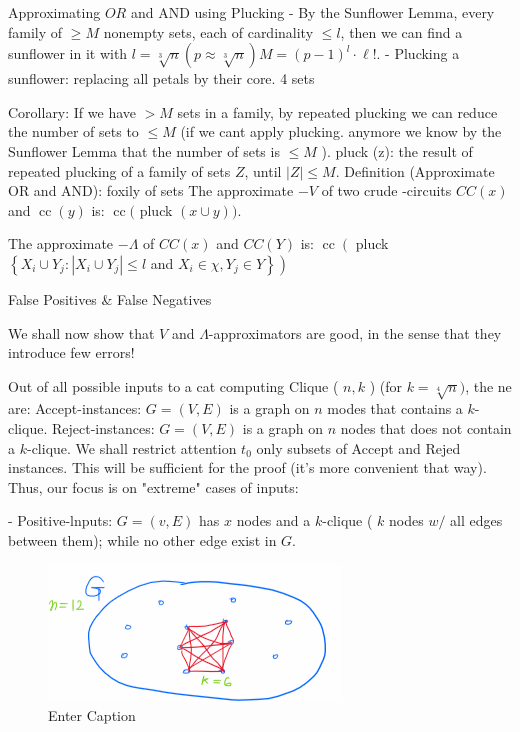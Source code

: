 Approximating $O R$ and AND using Plucking
- By the Sunflower Lemma, every family of $\geq M$ nonempty sets, each of cardinality $\leqslant l$, then we can find a sunflower in it with $l=\sqrt[3]{n}(p \approx \sqrt[3]{n}) M=(p-1)^l \cdot \ell!$.
- Plucking a sunflower: replacing all petals by their core. 4 sets

Corollary: If we have $>M$ sets in a family, by repeated plucking we can reduce the number of sets to $\leq M$ (if we cant apply plucking. anymore we know by the Sunflower Lemma that the number of sets is $\leqslant M$ ).
pluck (z): the result of repeated plucking of a family of sets $Z$, until $|Z| \leqslant M$.
Definition (Approximate OR and AND): foxily of sets The approximate $-V$ of two crude -circuits $C C(x)$ and $\operatorname{cc}(y)$ is: $\operatorname{cc}($ pluck $(x \cup y))$.

The approximate $-\Lambda$ of $C C(x)$ and $C C(Y)$ is: $\operatorname{cc}\left(\right.$ pluck $\left\{X_i \cup Y_j:\left|X_i \cup Y_j\right| \leqslant l\right.$ and $\left.\left.X_i \in \chi, Y_j \in Y\right\}\right)$





False Positives \& False Negatives

We shall now show that $V$ and $\Lambda$-approximators are good, in the sense that they introduce few errors!

Out of all possible inputs to a cat computing Clique ( $n, k$ ) (for $k=\sqrt[4]{n})$, the ne are:
Accept-instances: $G=(V, E)$ is a graph on $n$ modes that contains a $k$-clique.
Reject-instances: $G=(V, E)$ is a graph on $n$ nodes that does not contain a $k$-clique.
We shall restrict attention $t_0$ only subsets of Accept and Rejed instances. This will be sufficient for the proof (it's more convenient that way). Thus, our focus is on "extreme" cases of inputs:



- Positive-lnputs: $G=(v, E)$ has $x$ nodes and a $k$-clique ( $k$ nodes $w /$ all edges between them); while no other edge exist in $G$.

\begin{figure}[H]
    \centering
    \includegraphics[width=.5\linewidth]{images/clique1.png}
    \caption{Enter Caption}
    \label{fig:enter-label}
\end{figure}


